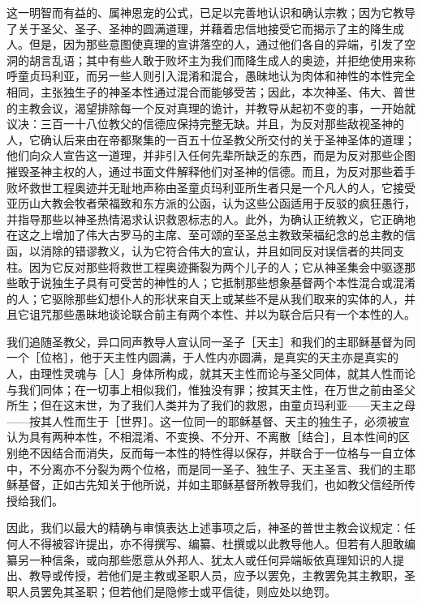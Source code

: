 这一明智而有益的、属神恩宠的公式，已足以完善地认识和确认宗教；因为它教导了关于圣父、圣子、圣神的圆满道理，并藉着忠信地接受它而揭示了主的降生成人。但是，因为那些意图使真理的宣讲落空的人，通过他们各自的异端，引发了空洞的胡言乱语；其中有些人敢于败坏主为我们而降生成人的奥迹，并拒绝使用来称呼童贞玛利亚，而另一些人则引入混淆和混合，愚昧地认为肉体和神性的本性完全相同，主张独生子的神圣本性通过混合而能够受苦；因此，本次神圣、伟大、普世的主教会议，渴望排除每一个反对真理的诡计，并教导从起初不变的事，一开始就议决：三百一十八位教父的信德应保持完整无缺。并且，为反对那些敌视圣神的人，它确认后来由在帝都聚集的一百五十位圣教父所交付的关于圣神圣体的道理；他们向众人宣告这一道理，并非引入任何先辈所缺乏的东西，而是为反对那些企图摧毁圣神主权的人，通过书面文件解释他们对圣神的信德。而且，为反对那些着手败坏救世工程奥迹并无耻地声称由圣童贞玛利亚所生者只是一个凡人的人，它接受亚历山大教会牧者荣福致和东方派的公函，认为这些公函适用于反驳的疯狂愚行，并指导那些以神圣热情渴求认识救恩标志的人。此外，为确认正统教义，它正确地在这之上增加了伟大古罗马的主席、至可颂的至圣总主教致荣福纪念的总主教的信函，以消除的错谬教义，认为它符合伟大的宣认，并且如同反对误信者的共同支柱。因为它反对那些将救世工程奥迹撕裂为两个儿子的人；它从神圣集会中驱逐那些敢于说独生子具有可受苦的神性的人；它抵制那些想象基督两个本性混合或混淆的人；它驱除那些幻想仆人的形状来自天上或某些不是从我们取来的实体的人，并且它诅咒那些愚昧地谈论联合前主有两个本性、并以为联合后只有一个本性的人。\par

我们追随圣教父，异口同声教导人宣认同一圣子［天主］和我们的主耶稣基督为同一个［位格］，他于天主性内圆满，于人性内亦圆满，是真实的天主亦是真实的人，由理性灵魂与［人］身体所构成，就其天主性而论与圣父同体，就其人性而论与我们同体；在一切事上相似我们，惟独没有罪；按其天主性，在万世之前由圣父所生；但在这末世，为了我们人类并为了我们的救恩，由童贞玛利亚——天主之母——按其人性而生于［世界］。这一位同一的耶稣基督、天主的独生子，必须被宣认为具有两种本性，不相混淆、不变换、不分开、不离散［结合］，且本性间的区别绝不因结合而消失，反而每一本性的特性得以保存，并联合于一位格与一自立体中，不分离亦不分裂为两个位格，而是同一圣子、独生子、天主圣言、我们的主耶稣基督，正如古先知关于他所说，并如主耶稣基督所教导我们，也如教父信经所传授给我们。\par

因此，我们以最大的精确与审慎表达上述事项之后，神圣的普世主教会议规定：任何人不得被容许提出，亦不得撰写、编纂、杜撰或以此教导他人。但若有人胆敢编纂另一种信条，或向那些愿意从外邦人、犹太人或任何异端皈依真理知识的人提出、教导或传授，若他们是主教或圣职人员，应予以罢免，主教罢免其主教职，圣职人员罢免其圣职；但若他们是隐修士或平信徒，则应处以绝罚。\par


